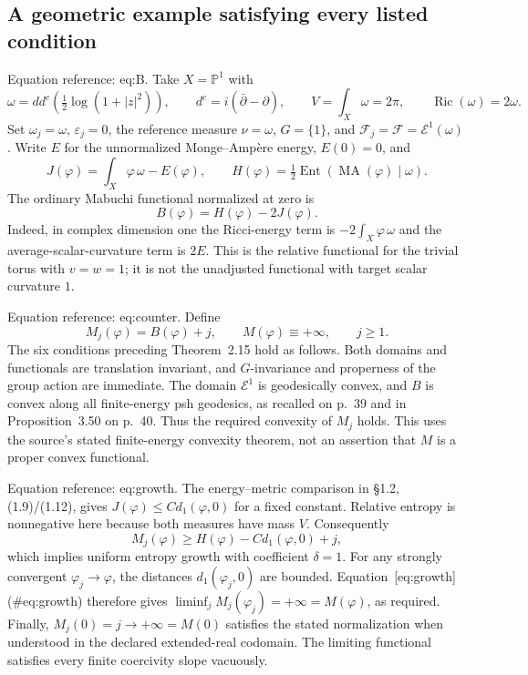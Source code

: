 \documentclass[10pt]{article}
\begin{document}
\subsection*{A geometric example satisfying every listed condition}
Equation reference: eq:B. Take \(X=\mathbb P^1\) with \[\omega=dd^c\!\left(\tfrac12\log(1+|z|^2)\right),\qquad
 d^c=i(\bar\partial-\partial),\qquad
 V=\int_X\omega=2\pi,\qquad \operatorname{Ric}(\omega)=2\omega.\] Set \(\omega_j=\omega\), \(\varepsilon_j=0\), the reference measure \(\nu=\omega\), \(G=\{1\}\), and \(\mathcal F_j=\mathcal F=\mathcal E^1(\omega)\). Write \(E\) for the unnormalized Monge–Ampère energy, \(E(0)=0\), and \[J(\varphi)=\int_X\varphi\,\omega-E(\varphi),\qquad
 H(\varphi)=\tfrac12\operatorname{Ent}(\operatorname{MA}(\varphi)\mid\omega).\] The ordinary Mabuchi functional normalized at zero is \[
 B(\varphi)=H(\varphi)-2J(\varphi).\] Indeed, in complex dimension one the Ricci-energy term is \(-2\int_X\varphi\,\omega\) and the average-scalar-curvature term is \(2E\). This is the relative functional for the trivial torus with \(v=w=1\); it is not the unadjusted functional with target scalar curvature \(1\).\par
Equation reference: eq:counter. Define \[
 M_j(\varphi)=B(\varphi)+j,\qquad M(\varphi)\equiv+\infty,\qquad j\ge1.\] The six conditions preceding Theorem 2.15 hold as follows. Both domains and functionals are translation invariant, and \(G\)-invariance and properness of the group action are immediate. The domain \(\mathcal E^1\) is geodesically convex, and \(B\) is convex along all finite-energy psh geodesics, as recalled on p. 39 and in Proposition 3.50 on p. 40. Thus the required convexity of \(M_j\) holds. This uses the source’s stated finite-energy convexity theorem, not an assertion that \(M\) is a proper convex functional.\par
Equation reference: eq:growth. The energy–metric comparison in §1.2, (1.9)/(1.12), gives \(J(\varphi)\le C d_1(\varphi,0)\) for a fixed constant. Relative entropy is nonnegative here because both measures have mass \(V\). Consequently \[
 M_j(\varphi)\ge H(\varphi)-C d_1(\varphi,0)+j,\] which implies uniform entropy growth with coefficient \(\delta=1\). For any strongly convergent \(\varphi_j\to\varphi\), the distances \(d_1(\varphi_j,0)\) are bounded. Equation [eq:growth] (\#eq:growth) therefore gives \(\liminf_jM_j(\varphi_j)=+\infty=M(\varphi)\), as required. Finally, \(M_j(0)=j\to+\infty=M(0)\) satisfies the stated normalization when understood in the declared extended-real codomain. The limiting functional satisfies every finite coercivity slope vacuously.\par
\end{document}
